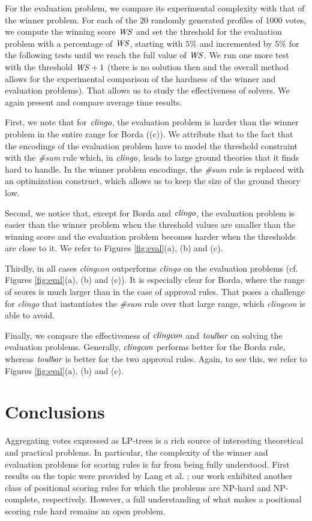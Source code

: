 For the evaluation problem, we compare its experimental complexity with
that of the winner problem. For each of the $20$ randomly generated profiles
of 1000 votes, we
compute the winning score $\mathit{WS}$ and set the threshold for the evaluation problem
with a percentage of $\mathit{WS}$, starting with $5\%$ and incremented by $5\%$ for the
following tests until we reach the full value of $\mathit{WS}$. We run one more test with the
threshold $\mathit{WS} +1$ (there is no solution then and the overall method allows for the
experimental comparison of the hardness of the winner and evaluation problems).
That allows us to study the effectiveness of solvers. We again present and
compare average time results.

First, we note that for $\textit{clingo}$, the evaluation problem is
harder than the winner problem in the entire range for Borda ((c)).
We attribute that to the fact that the encodings 
of the evaluation problem have to model the threshold constraint with the 
\textit{\#sum} rule which, in $\textit{clingo}$, leads to large ground theories 
that it finds hard to handle. In the winner problem encodings, the \textit{\#sum} 
rule is replaced with an optimization construct, which allows us to keep
the size of the ground theory low.

Second, we notice that, except for Borda and $\textit{clingo}$,
the evaluation problem is easier than the winner problem
when the threshold values are smaller than the winning score and 
the evaluation problem becomes harder when the thresholds are close to it.
We refer to Figures \ref{fig:eval}(a), (b) and (c).

Thirdly, in all cases \emph{clingcon} outperforms \emph{clingo} on the
evaluation problems (cf. Figures \ref{fig:eval}(a), (b) and (c)). 
It is especially clear for Borda, where the range of
scores is much larger than in the case of approval rules. That poses a
challenge for \emph{clingo} that instantiates the \textit{\#sum} rule over
that large range, which \emph{clingcon} is able to avoid.

Finally, we compare the effectiveness of $\textit{clingcon}$ and $\textit{toulbar}$ on
solving the evaluation problems. Generally, $\textit{clingcon}$ performs better
for the Borda rule, whereas $\textit{toulbar}$ is better for the two approval rules.
Again, to see this, we refer to Figures \ref{fig:eval}(a), (b) and (c).


\section{Conclusions}
Aggregating votes expressed as LP-trees is a rich source of interesting
theoretical and practical problems. In particular, the complexity of the
winner and evaluation problems for scoring rules is far from
being fully understood. First results on the topic were provided by 
Lang et al. \cite{lang:aggLP}; our work exhibited another class of positional
scoring rules for which the problems are NP-hard and NP-complete, 
respectively. However, a full understanding of what makes a positional 
scoring rule hard remains an open problem.

